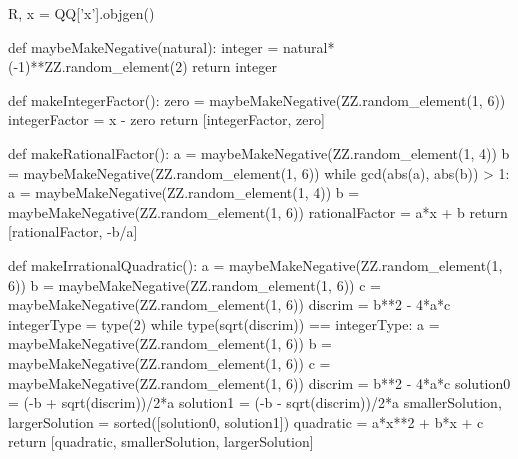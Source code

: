\documentclass{ximera}
\begin{document}
\begin{sagesilent}
R, x = QQ['x'].objgen()
 
def maybeMakeNegative(natural):
    integer = natural*(-1)**ZZ.random_element(2)
    return integer
 
def makeIntegerFactor():
    zero = maybeMakeNegative(ZZ.random_element(1, 6))
    integerFactor = x - zero
    return [integerFactor, zero]
 
def makeRationalFactor():
    a = maybeMakeNegative(ZZ.random_element(1, 4))
    b = maybeMakeNegative(ZZ.random_element(1, 6))
    while gcd(abs(a), abs(b)) > 1:
        a = maybeMakeNegative(ZZ.random_element(1, 4))
        b = maybeMakeNegative(ZZ.random_element(1, 6))
    rationalFactor = a*x + b
    return [rationalFactor, -b/a]
 
def makeIrrationalQuadratic():
    a = maybeMakeNegative(ZZ.random_element(1, 6))
    b = maybeMakeNegative(ZZ.random_element(1, 6))
    c = maybeMakeNegative(ZZ.random_element(1, 6))
    discrim = b**2 - 4*a*c
    integerType = type(2)
    while type(sqrt(discrim)) == integerType:
        a = maybeMakeNegative(ZZ.random_element(1, 6))
        b = maybeMakeNegative(ZZ.random_element(1, 6))
        c = maybeMakeNegative(ZZ.random_element(1, 6))
        discrim = b**2 - 4*a*c
    solution0 = (-b + sqrt(discrim))/2*a
    solution1 = (-b - sqrt(discrim))/2*a
    smallerSolution, largerSolution = sorted([solution0, solution1])
    quadratic = a*x**2 + b*x + c
    return [quadratic, smallerSolution, largerSolution]
 

\end{sagesilent}
\end{document}
